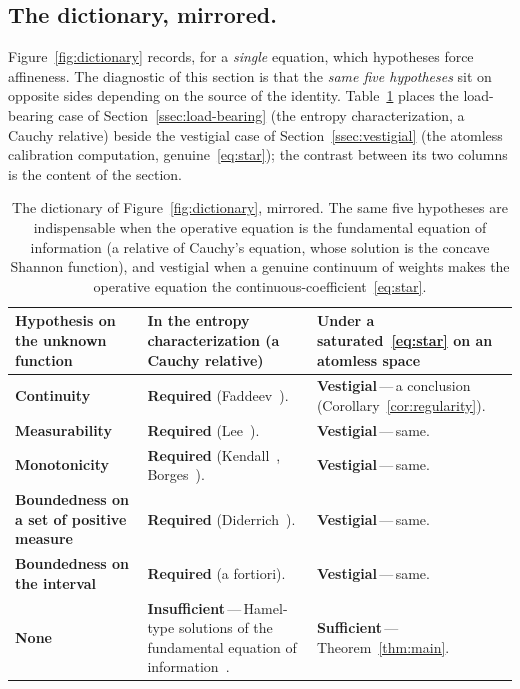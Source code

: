 \documentclass{article}
\theoremstyle{plain}
\theoremstyle{definition}
\begin{document}
\subsection{The dictionary, mirrored.}
\label{ssec:mirror}

Figure~\ref{fig:dictionary} records, for a \emph{single} equation,
which hypotheses force affineness. The diagnostic of this section is
that the \emph{same five hypotheses} sit on opposite sides depending
on the source of the identity. Table~\ref{tab:mirror} places the
load-bearing case of Section~\ref{ssec:load-bearing} (the entropy
characterization, a Cauchy relative) beside the vestigial case of
Section~\ref{ssec:vestigial} (the atomless calibration computation,
genuine~\eqref{eq:star}); the contrast between its two columns is
the content of the section.

\begin{table}[ht]
\renewcommand{\arraystretch}{1.4}
\centering
\begin{tabularx}{\linewidth}{@{} >{\raggedright\arraybackslash}X |
  >{\raggedright\arraybackslash}X |
  >{\raggedright\arraybackslash}X @{}}
\toprule
\textbf{Hypothesis on the unknown function} &
\textbf{In the entropy characterization (a Cauchy relative)} &
\textbf{Under a saturated~\eqref{eq:star} on an atomless space} \\
\midrule
\textbf{Continuity}
  & \textbf{Required} (Faddeev~\cite{Faddeev1957}).
  & \textbf{Vestigial}\,---\,a conclusion (Corollary~\ref{cor:regularity}). \\
\midrule
\textbf{Measurability}
  & \textbf{Required} (Lee~\cite{Lee1964}).
  & \textbf{Vestigial}\,---\,same. \\
\midrule
\textbf{Monotonicity}
  & \textbf{Required} (Kendall~\cite{Kendall1964}, Borges~\cite{Borges1967}).
  & \textbf{Vestigial}\,---\,same. \\
\midrule
\textbf{Boundedness on a set of positive measure}
  & \textbf{Required} (Diderrich~\cite{Diderrich1975}).
  & \textbf{Vestigial}\,---\,same. \\
\midrule
\textbf{Boundedness on the interval}
  & \textbf{Required} (a fortiori).
  & \textbf{Vestigial}\,---\,same. \\
\midrule
\textbf{None}
  & \textbf{Insufficient}\,---\,Hamel-type solutions of the fundamental equation of information~\cite{AczelDaroczy1975}.
  & \textbf{Sufficient}\,---\,Theorem~\ref{thm:main}. \\
\bottomrule
\end{tabularx}
\caption{The dictionary of Figure~\ref{fig:dictionary}, mirrored. The
same five hypotheses are indispensable when the operative equation is
the fundamental equation of information (a relative of Cauchy's
equation, whose solution is the concave Shannon function), and
vestigial when a genuine continuum of weights makes the operative
equation the continuous-coefficient~\eqref{eq:star}.}
\label{tab:mirror}
\end{table}
\end{document}
